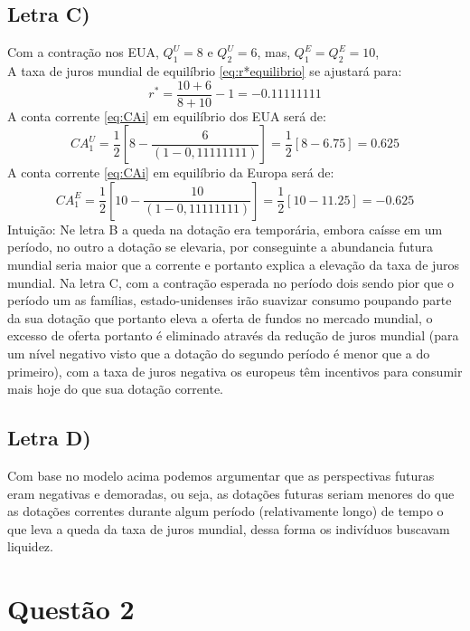 \documentclass{article}
\begin{document}
\subsection*{Letra C)}
Com a contração nos EUA, $Q_1^{U}=8$ e $Q_2^{U}=6$, mas, $Q_1^E=Q_2^E=10$,\\
A taxa de juros mundial de equilíbrio \eqref{eq:r*equilibrio} se ajustará para:
\begin{equation}
    r^*=\frac{10+6}{8 + 10}-1 = -0.11111111
\end{equation}
A conta corrente \eqref{eq:CAi} em equilíbrio dos EUA será de:
\begin{equation}
    CA_1^{U}=\frac{1}{2}\left[8-\frac{6}{(1-0,11111111)}\right] = \frac{1}{2}\left[8-6.75\right] = 0.625
\end{equation}
A conta corrente \eqref{eq:CAi} em equilíbrio da Europa será de:
\begin{equation}
    CA_1^{E}=\frac{1}{2}\left[10-\frac{10}{(1-0,11111111)}\right] = \frac{1}{2}\left[10-11.25\right] = -0.625
\end{equation}
Intuição:
Ne letra B a queda na dotação era temporária, embora caísse em um período, no outro a dotação se elevaria, por conseguinte a abundancia futura mundial seria maior que a corrente e portanto explica a elevação da taxa de juros mundial.
Na letra C, com a contração esperada no período dois sendo pior que o período um as famílias, estado-unidenses irão suavizar consumo poupando parte da sua dotação que portanto eleva a oferta de fundos no mercado mundial, o excesso de oferta portanto é eliminado através da redução de juros mundial (para um nível negativo visto que a dotação do segundo período é menor que a do primeiro), com a taxa de juros negativa os europeus têm incentivos para consumir mais hoje do que sua dotação corrente. 

\subsection*{Letra D)}
Com base no modelo acima podemos argumentar que as perspectivas futuras eram negativas e demoradas, ou seja, as dotações futuras seriam menores do que as dotações correntes durante algum período (relativamente longo) de tempo o que leva a queda da taxa de juros mundial, dessa forma os indivíduos buscavam liquidez.

\section*{Questão 2}
\end{document}
